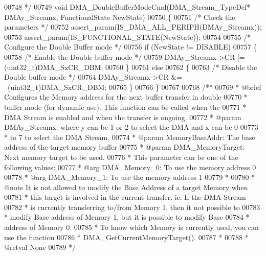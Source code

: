 \begin{DoxyCode}
00748 \textcolor{comment}{  */}
00749 \textcolor{keywordtype}{void} DMA_DoubleBufferModeCmd(DMA\_Stream\_TypeDef* DMAy\_Streamx, FunctionalState NewState)
00750 \{
00751   \textcolor{comment}{/* Check the parameters */}
00752   assert_param(IS\_DMA\_ALL\_PERIPH(DMAy\_Streamx));
00753   assert_param(IS\_FUNCTIONAL\_STATE(NewState));
00754 
00755   \textcolor{comment}{/* Configure the Double Buffer mode */}
00756   \textcolor{keywordflow}{if} (NewState != DISABLE)
00757   \{
00758     \textcolor{comment}{/* Enable the Double buffer mode */}
00759     DMAy\_Streamx->CR |= (uint32\_t)DMA_SxCR_DBM;
00760   \}
00761   \textcolor{keywordflow}{else}
00762   \{
00763     \textcolor{comment}{/* Disable the Double buffer mode */}
00764     DMAy\_Streamx->CR &= ~(uint32\_t)DMA_SxCR_DBM;
00765   \}
00766 \}
00767 
00768 \textcolor{comment}{/**}
00769 \textcolor{comment}{  * @brief  Configures the Memory address for the next buffer transfer in double}
00770 \textcolor{comment}{  *         buffer mode (for dynamic use). This function can be called when the}
00771 \textcolor{comment}{  *         DMA Stream is enabled and when the transfer is ongoing.  }
00772 \textcolor{comment}{  * @param  DMAy\_Streamx: where y can be 1 or 2 to select the DMA and x can be 0}
00773 \textcolor{comment}{  *          to 7 to select the DMA Stream.}
00774 \textcolor{comment}{  * @param  MemoryBaseAddr: The base address of the target memory buffer}
00775 \textcolor{comment}{  * @param  DMA\_MemoryTarget: Next memory target to be used. }
00776 \textcolor{comment}{  *         This parameter can be one of the following values:}
00777 \textcolor{comment}{  *            @arg DMA\_Memory\_0: To use the memory address 0}
00778 \textcolor{comment}{  *            @arg DMA\_Memory\_1: To use the memory address 1}
00779 \textcolor{comment}{  * }
00780 \textcolor{comment}{  * @note    It is not allowed to modify the Base Address of a target Memory when}
00781 \textcolor{comment}{  *          this target is involved in the current transfer. ie. If the DMA Stream}
00782 \textcolor{comment}{  *          is currently transferring to/from Memory 1, then it not possible to}
00783 \textcolor{comment}{  *          modify Base address of Memory 1, but it is possible to modify Base}
00784 \textcolor{comment}{  *          address of Memory 0.}
00785 \textcolor{comment}{  *          To know which Memory is currently used, you can use the function}
00786 \textcolor{comment}{  *          DMA\_GetCurrentMemoryTarget().             }
00787 \textcolor{comment}{  *  }
00788 \textcolor{comment}{  * @retval None}
00789 \textcolor{comment}{  */}

\end{DoxyCode}
